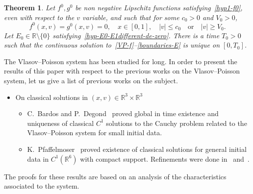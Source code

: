 \documentclass[10pt]{amsart}
\newtheorem{theo}{Theorem}[section]
\theoremstyle{definition}\newtheorem{defi}[theo]{Definition}\newtheorem{rema}[theo]{Remark}\newtheorem{exam}[theo]{Example}\newtheorem{exem}[theo]{Example}\newtheorem{nota}[theo]{Notation}
\newcommand{\R}{\mathbb{R}}
\begin{document}
\begin{theo}\label{main-result-unicite}
Let $f^0, g^0$ be non negative Lipschitz functions satisfying~\eqref{hyp1-f0}, even with respect to the $v$ variable, and such that for some $c_0>0$ and $V_0>0$,
\[
f^0(x,v)= g^0(x,v)= 0,\quad x\in [0,1],\quad |v| \leq c_0 \quad \text{or}\quad |v| \geq V_0.
\]
Let $E_0\in \R \setminus \{ 0\} $ satisfying~\eqref{hyp-E0-E1different-de-zero}. 
There is a time $T_0>0$ such that the continuous solution to~\eqref{VP-f}--\eqref{boundaries-E} is unique on $[0, T_0] $.
\end{theo}

The Vlasov--Poisson system has been studied for long. In order to present the results of this paper with respect to the previous works on the Vlasov--Poisson system, let us give a list of previous works on the subject. 
\begin{itemize}
\item On classical solutions in $(x,v)\in \R ^3\times \R ^3$
\begin{itemize}
\item[-] C.~Bardos and P.~Degond~\cite{BD85} proved global in time existence and uniqueness of classical $C^1$ solutions to the Cauchy problem related to the Vlasov--Poisson system for small initial data.
\item[-] K.~Pfaffelmoser~\cite{Pfa92} proved existence of classical solutions for general initial data in $C^1(\R ^6)$ with compact support. Refinements were done in~\cite{Sch91} and~\cite{Rei97}.
\end{itemize}
\end{itemize}
The proofs for these results are based on an analysis of the characteristics associated to the system.
\vspace{4pt}
\end{document}
